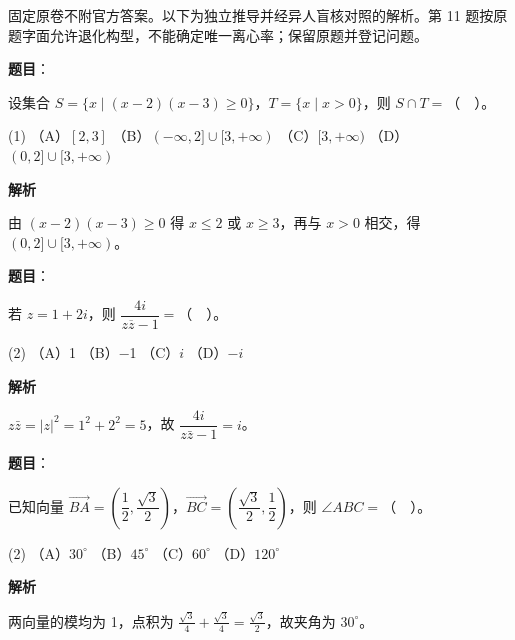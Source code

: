 

\begin{gktip}
固定原卷不附官方答案。以下为独立推导并经异人盲核对照的解析。第 11 题按原题字面允许退化构型，不能确定唯一离心率；保留原题并登记问题。
\end{gktip}

\begin{answer}

\textbf{题目}：

设集合 \(S=\{x\mid (x-2)(x-3)\geq 0\}\)，\(T=\{x\mid x>0\}\)，则 \(S\cap T=\)（　）。

\begin{gkopts}(1)
\task （A）\([2,3]\)
\task （B）\((-\infty,2]\cup[3,+\infty)\)
\task （C）\([3,+\infty)\)
\task （D）\((0,2]\cup[3,+\infty)\)
\end{gkopts}

\textbf{解析}

由 \((x-2)(x-3)\geq0\) 得 \(x\leq2\) 或 \(x\geq3\)，再与 \(x>0\) 相交，得 \((0,2]\cup[3,+\infty)\)。

\gkanswer{答案：D，\((0,2]\cup[3,+\infty)\)}

\end{answer}
\begin{answer}

\textbf{题目}：

若 \(z=1+2i\)，则 \(\dfrac{4i}{z\overline z-1}=\)（　）。

\begin{gkopts}(2)
\task （A）1
\task （B）$-$1
\task （C）\(i\)
\task （D）\(-i\)
\end{gkopts}

\textbf{解析}

\(z\bar z=|z|^2=1^2+2^2=5\)，故 \(\dfrac{4i}{z\bar z-1}=i\)。


\end{answer}
\begin{answer}

\textbf{题目}：

已知向量 \(\overrightarrow{BA}=\left(\dfrac12,\dfrac{\sqrt3}{2}\right)\)，\(\overrightarrow{BC}=\left(\dfrac{\sqrt3}{2},\dfrac12\right)\)，则 \(\angle ABC=\)（　）。

\begin{gkopts}(2)
\task （A）\(30^\circ\)
\task （B）\(45^\circ\)
\task （C）\(60^\circ\)
\task （D）\(120^\circ\)
\end{gkopts}

\textbf{解析}

两向量的模均为 1，点积为 \(\frac{\sqrt3}{4}+\frac{\sqrt3}{4}=\frac{\sqrt3}{2}\)，故夹角为 \(30^\circ\)。


\end{answer}
